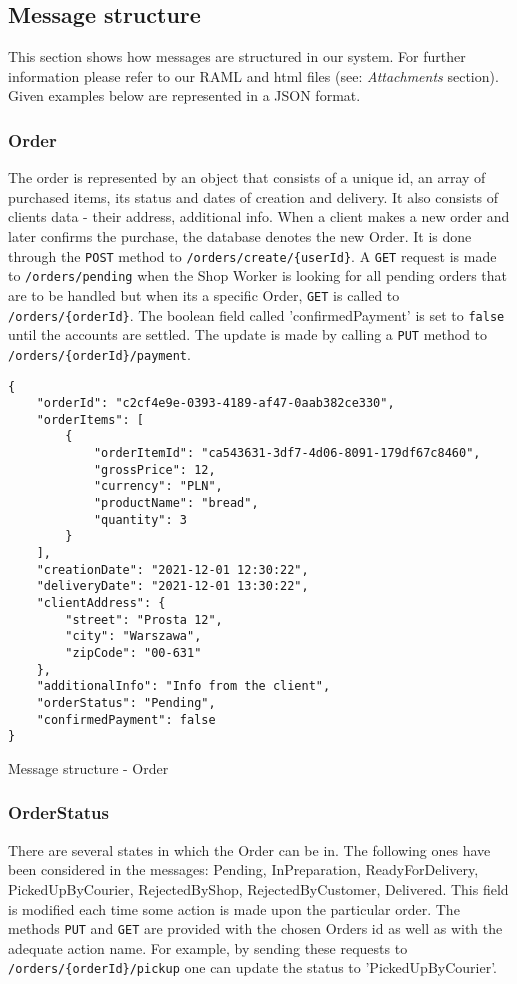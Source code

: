 \documentclass[../main.tex]{subfiles}
\begin{document}
\subsection{Message structure}
\vspace{5mm}
This section shows how messages are structured in our system. For further information please refer to our RAML and html files (see: \textit{Attachments} section). Given examples below are represented in a JSON format.

\subsubsection{Order}
The order is represented by an object that consists of a unique id, an array of purchased items, its status and dates of creation and delivery. It also consists of clients data - their address, additional info. 
When a client makes a new order and later confirms the purchase, the database denotes the new Order. It is done through the \texttt{POST} method to \texttt{/orders/create/\{userId\}}. A \texttt{GET} request is made to \texttt{/orders/pending} when the Shop Worker is looking for all pending orders that are to be handled but when its a specific Order, \texttt{GET} is called to \texttt{/orders/\{orderId\}}. The boolean field called 'confirmedPayment' is set to \texttt{false} until the accounts are settled. The update is made by calling a \texttt{PUT} method to \texttt{/orders/\{orderId\}/payment}.

\begin{listing}[htp]
\begin{verbatim}
{
    "orderId": "c2cf4e9e-0393-4189-af47-0aab382ce330",
    "orderItems": [
        {
            "orderItemId": "ca543631-3df7-4d06-8091-179df67c8460",
            "grossPrice": 12,
            "currency": "PLN",
            "productName": "bread",
            "quantity": 3
        }
    ],
    "creationDate": "2021-12-01 12:30:22",
    "deliveryDate": "2021-12-01 13:30:22",
    "clientAddress": {
        "street": "Prosta 12",
        "city": "Warszawa",
        "zipCode": "00-631"
    },
    "additionalInfo": "Info from the client",
    "orderStatus": "Pending",
    "confirmedPayment": false
}
\end{verbatim}
\caption{Message structure - Order}
\end{listing}

\subsubsection{OrderStatus}
There are several states in which the Order can be in. The following ones have been considered in the messages: Pending, InPreparation, ReadyForDelivery, PickedUpByCourier, RejectedByShop, RejectedByCustomer, Delivered. This field is modified each time some action is made upon the particular order. The methods 
\texttt{PUT} and \texttt{GET} are provided with the chosen Orders id as well as with the adequate action name. For example, by sending these requests to \texttt{/orders/\{orderId\}/pickup} one can update the status to 'PickedUpByCourier'. 
\end{document}
